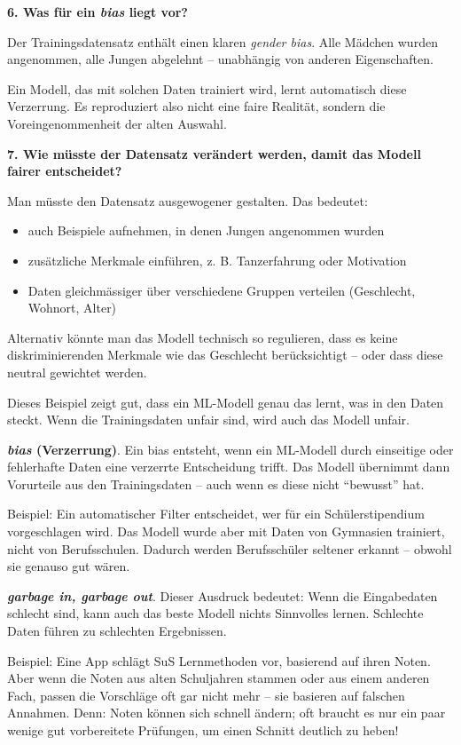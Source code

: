 \begin{aufgabe}{6}
\vspace{0.5em}
\textbf{6. Was für ein \textit{bias} liegt vor?}

Der Trainingsdatensatz enthält einen klaren \textit{gender bias}. Alle Mädchen wurden angenommen, alle Jungen abgelehnt – unabhängig von anderen Eigenschaften.

Ein Modell, das mit solchen Daten trainiert wird, lernt automatisch diese Verzerrung. Es reproduziert also nicht eine faire Realität, sondern die Voreingenommenheit der alten Auswahl.

\vspace{0.5em}
\textbf{7. Wie müsste der Datensatz verändert werden, damit das Modell fairer entscheidet?}

Man müsste den Datensatz ausgewogener gestalten. Das bedeutet:

\begin{itemize}
  \item auch Beispiele aufnehmen, in denen Jungen angenommen wurden
  \item zusätzliche Merkmale einführen, z. B. Tanzerfahrung oder Motivation
  \item Daten gleichmässiger über verschiedene Gruppen verteilen (Geschlecht, Wohnort, Alter)
\end{itemize}

Alternativ könnte man das Modell technisch so regulieren, dass es keine diskriminierenden Merkmale wie das Geschlecht berücksichtigt – oder dass diese neutral gewichtet werden.

Dieses Beispiel zeigt gut, dass ein ML-Modell genau das lernt, was in den Daten steckt. Wenn die Trainingsdaten unfair sind, wird auch das Modell unfair.

\end{aufgabe}

\begin{aufgabe}{7}

\textbf{\textit{bias} (Verzerrung)}.
Ein bias entsteht, wenn ein ML-Modell durch einseitige oder fehlerhafte Daten eine verzerrte Entscheidung trifft. Das Modell übernimmt dann Vorurteile aus den Trainingsdaten – auch wenn es diese nicht ``bewusst'' hat.

Beispiel: Ein automatischer Filter entscheidet, wer für ein Schülerstipendium vorgeschlagen wird. Das Modell wurde aber mit Daten von Gymnasien trainiert, nicht von Berufsschulen. Dadurch werden Berufsschüler seltener erkannt – obwohl sie genauso gut wären.


\textbf{\textit{garbage in, garbage out}}.
Dieser Ausdruck bedeutet: Wenn die Eingabedaten schlecht sind, kann auch das beste Modell nichts Sinnvolles lernen. Schlechte Daten führen zu schlechten Ergebnissen.

Beispiel: Eine App schlägt SuS Lernmethoden vor, basierend auf ihren Noten. Aber wenn die Noten aus alten Schuljahren stammen oder aus einem anderen Fach, passen die Vorschläge oft gar nicht mehr – sie basieren auf falschen Annahmen. Denn: Noten können sich schnell ändern; oft braucht es nur ein paar wenige gut vorbereitete Prüfungen, um einen Schnitt deutlich zu heben!

\end{aufgabe}
